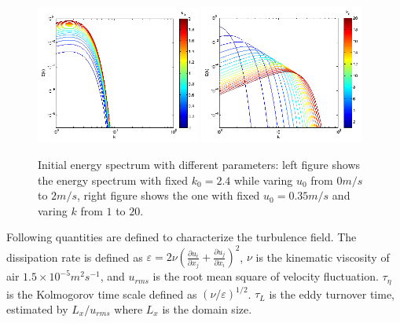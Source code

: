 \begin{figure}\centering
\includegraphics[width=0.48\textwidth]{Figures/eng_spr_u}
\includegraphics[width=0.48\textwidth]{Figures/eng_spr_k}
\caption{Initial energy spectrum with different parameters: left figure shows the energy spectrum with fixed $k_0 = 2.4$ while varing $u_0$ from $0m/s$ to $2m/s$, right figure shows the one with fixed $u_0 = 0.35m/s$ and varing $k$ from $1$ to $20$.\label{fig:eng_spr}}
\end{figure}

Following quantities are defined to characterize the turbulence field.  The
dissipation rate is defined as $\varepsilon=2\nu(\frac{\partial u_{i}}{\partial
x_{j}}+\frac{\partial u_{j}}{\partial x_{i}})^{2}$, $\nu$ is the kinematic
viscosity of air $1.5\times10^{-5}m^{2}s^{-1}$, and $u_{rms}$ is the root mean
square of velocity fluctuation. $\tau_{\eta}$ is the Kolmogorov time scale
defined as $(\nu/\varepsilon)^{1/2}$. $\tau_L$ is the eddy turnover time,
estimated by $L_x/u_{rms}$ where $L_x$ is the domain size.


